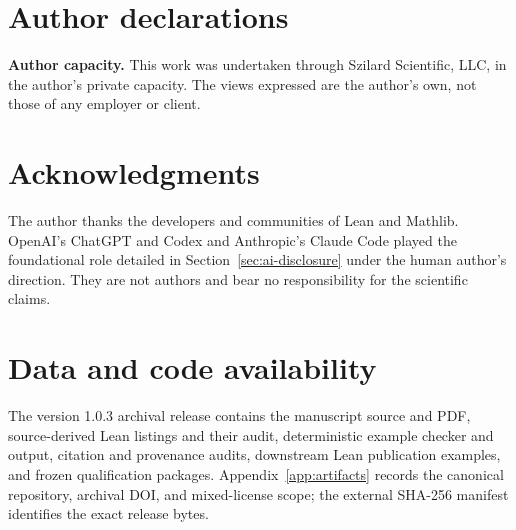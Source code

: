 \documentclass[11pt]{article}
\newcommand{\ReleaseVersion}{1.0.3}
\begin{document}
\section*{Author declarations}
\textbf{Author capacity.} This work was undertaken through Szilard Scientific, LLC, in the author's private capacity.  The views expressed are the author's own, not those of any employer or client.

\section*{Acknowledgments}
The author thanks the developers and communities of Lean and Mathlib.  OpenAI's ChatGPT and Codex and Anthropic's Claude Code played the foundational role detailed in Section~\ref{sec:ai-disclosure} under the human author's direction.  They are not authors and bear no responsibility for the scientific claims.

\section*{Data and code availability}
The version \ReleaseVersion{} archival release contains the manuscript source and PDF, source-derived Lean listings and their audit, deterministic example checker and output, citation and provenance audits, downstream Lean publication examples, and frozen qualification packages.  Appendix~\ref{app:artifacts} records the canonical repository, archival DOI, and mixed-license scope; the external SHA-256 manifest identifies the exact release bytes.
\end{document}
